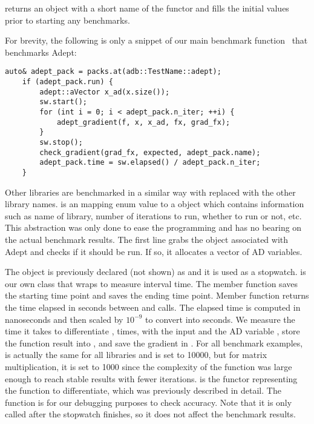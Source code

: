 returns an  object with a short name of the functor
and  fills the initial values prior to starting any benchmarks. 
\fi

For brevity, the following is only a snippet of our main
benchmark function~ that benchmarks Adept:
\begin{lstlisting}[style=customcpp]
    auto& adept_pack = packs.at(adb::TestName::adept);
    if (adept_pack.run) {
        adept::aVector x_ad(x.size());
        sw.start();
        for (int i = 0; i < adept_pack.n_iter; ++i) {
            adept_gradient(f, x, x_ad, fx, grad_fx);
        }
        sw.stop();
        check_gradient(grad_fx, expected, adept_pack.name);
        adept_pack.time = sw.elapsed() / adept_pack.n_iter;
    }
\end{lstlisting}
Other libraries are benchmarked in a similar way with  replaced with the other library names.
 is an  mapping  enum value to a  object
which contains information such as name of library, number of iterations to run, whether to run or not, etc.
This abstraction was only done to ease the programming and has no bearing on the actual benchmark results.
The first line grabs the  object associated with Adept and checks if it should be run.
If so, it allocates a vector of AD variables.
\fi

The object  is previously declared (not shown) as  and it is used as a stopwatch.
 is our own class that wraps  to measure interval time.
The member function  saves the starting time point and  saves the ending time point.
Member function  returns the time elapsed in seconds between  and  calls.
The elapsed time is computed in nanoseconds and then scaled by $10^{-9}$ to convert into seconds.
We measure the time it takes to differentiate ,  times,
with the input  and the AD variable ,
store the function result into , and save the gradient in .
For all benchmark examples,  is actually the same for all libraries and is set to 10000,
but for matrix multiplication, it is set to 1000 
since the complexity of the function was large enough to reach stable results with fewer iterations.
 is the functor representing the function to differentiate,
which was previously described in detail.
The function  is for our debugging purposes to check accuracy.
Note that it is only called after the stopwatch finishes, so it does not affect the benchmark results.
\fi

